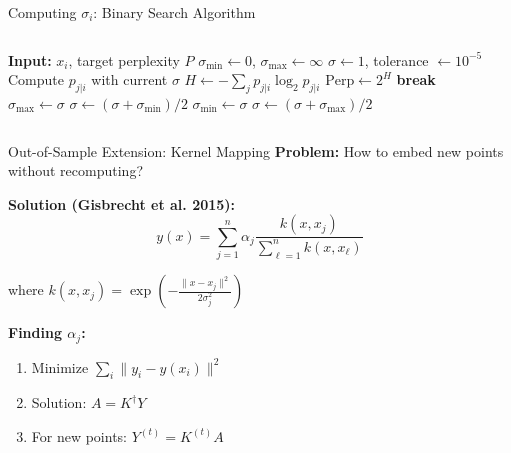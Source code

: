 \begin{frame}{Computing $\sigma_i$: Binary Search Algorithm}
\begin{columns}
    \begin{algorithmic}[1]
        \State \textbf{Input:} $x_i$, target perplexity $P$
        \State $\sigma_{\min} \leftarrow 0$, $\sigma_{\max} \leftarrow \infty$
        \State $\sigma \leftarrow 1$, tolerance $\leftarrow 10^{-5}$
            \State Compute $p_{j|i}$ with current $\sigma$
            \State $H \leftarrow -\sum_j p_{j|i} \log_2 p_{j|i}$
            \State $\text{Perp} \leftarrow 2^H$
                \State \textbf{break}
                \State $\sigma_{\max} \leftarrow \sigma$
                \State $\sigma \leftarrow (\sigma + \sigma_{\min})/2$
            \Else
                \State $\sigma_{\min} \leftarrow \sigma$
                \State $\sigma \leftarrow (\sigma + \sigma_{\max})/2$
            \EndIf
        \EndWhile
    \end{algorithmic}

    \begin{center}
    \end{center}
\end{columns}

\end{frame}

\begin{frame}{Out-of-Sample Extension: Kernel Mapping}
\textbf{Problem:} How to embed new points without recomputing?

\textbf{Solution (Gisbrecht et al. 2015):}
$$y(x) = \sum_{j=1}^n \alpha_j \frac{k(x, x_j)}{\sum_{\ell=1}^n k(x, x_\ell)}$$

where $k(x, x_j) = \exp\left(-\frac{\|x - x_j\|^2}{2\sigma_j^2}\right)$

\textbf{Finding $\alpha_j$:}
\begin{enumerate}
\item Minimize $\sum_i \|y_i - y(x_i)\|^2$
\item Solution: $A = K^{\dagger}Y$
\item For new points: $Y^{(t)} = K^{(t)}A$
\end{enumerate}

\end{frame}

